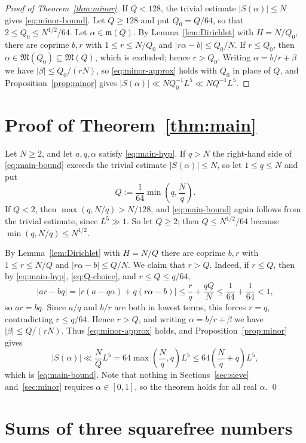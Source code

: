 \documentclass[11pt]{amsart}
\numberwithin{equation}{section}
\numberwithin{figure}{section}
\theoremstyle{definition}
\newcommand{\Major}{\mathfrak{M}}
\newcommand{\Minor}{\mathfrak{m}}
\begin{document}
\begin{proof}[Proof of Theorem~\ref{thm:minor}]
If $Q<128$, the trivial estimate $|S(\alpha)|\le N$ gives
\eqref{eq:minor-bound}.  Let $Q\ge128$ and put $Q_0=Q/64$, so that
$2\le Q_0\le N^{1/2}/64$.  Let $\alpha\in\Minor(Q)$.  By
Lemma~\ref{lem:Dirichlet} with $H=N/Q_0$, there are coprime $b,r$ with
$1\le r\le N/Q_0$ and $|r\alpha-b|\le Q_0/N$.  If $r\le Q_0$, then
$\alpha\in\Major(Q_0)\subseteq\Major(Q)$, which is excluded; hence
$r>Q_0$.  Writing $\alpha=b/r+\beta$ we have $|\beta|\le Q_0/(rN)$, so
\eqref{eq:minor-approx} holds with $Q_0$ in place of $Q$, and
Proposition~\ref{prop:minor} gives
$|S(\alpha)|\ll NQ_0^{-1}L^5\ll NQ^{-1}L^5$.
\end{proof}


\section{Proof of Theorem~\ref{thm:main}}\label{sec:rational}

Let $N\ge2$, and let $a,q,\alpha$ satisfy \eqref{eq:main-hyp}.  If $q>N$
the right-hand side of \eqref{eq:main-bound} exceeds the trivial estimate
$|S(\alpha)|\le N$, so let $1\le q\le N$ and put
\begin{equation}\label{eq:Q-choice}
  Q:=\frac1{64}\min\left(q,\frac Nq\right).
\end{equation}
If $Q<2$, then $\max(q,N/q)>N/128$, and \eqref{eq:main-bound} again
follows from the trivial estimate, since $L^5\gg1$.  So let $Q\ge2$; then
$Q\le N^{1/2}/64$ because $\min(q,N/q)\le N^{1/2}$.

By Lemma~\ref{lem:Dirichlet} with $H=N/Q$ there are coprime $b,r$ with
$1\le r\le N/Q$ and $|r\alpha-b|\le Q/N$.  We claim that $r>Q$.  Indeed,
if $r\le Q$, then by \eqref{eq:main-hyp}, \eqref{eq:Q-choice}, and
$r\le Q\le q/64$,
\[
  |ar-bq|=|r(a-q\alpha)+q(r\alpha-b)|
  \le\frac rq+\frac{qQ}N\le\frac1{64}+\frac1{64}<1,
\]
so $ar=bq$.  Since $a/q$ and $b/r$ are both in lowest terms, this forces
$r=q$, contradicting $r\le q/64$.  Hence $r>Q$, and writing
$\alpha=b/r+\beta$ we have $|\beta|\le Q/(rN)$.  Thus
\eqref{eq:minor-approx} holds, and Proposition~\ref{prop:minor} gives
\[
  |S(\alpha)|\ll\frac NQL^5=64\max\left(\frac Nq,q\right)L^5
  \le64\left(\frac Nq+q\right)L^5,
\]
which is \eqref{eq:main-bound}.  Note that nothing in
Sections~\ref{sec:sieve} and~\ref{sec:minor} requires $\alpha\in[0,1]$, so
the theorem holds for all real $\alpha$.
\qed


\section{Sums of three squarefree numbers}\label{sec:three}
\end{document}
